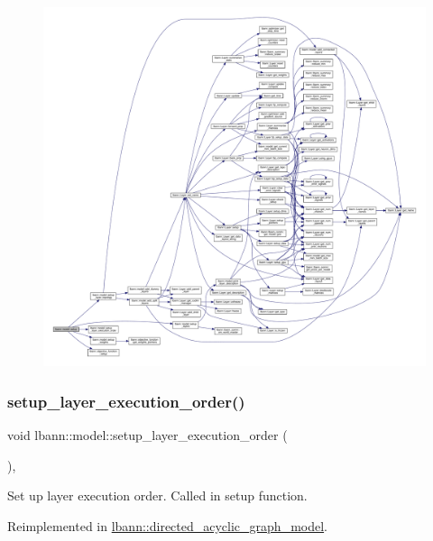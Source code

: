 \begin{figure}[H]
\begin{center}
\leavevmode
\includegraphics[width=350pt]{classlbann_1_1model_afd9dbca79503a40b7aa5c78da4d6f391_cgraph}
\end{center}
\end{figure}
\mbox{\label{classlbann_1_1model_ab0e8af146d4121c1b8b04b4a3c2a455c}} 
\subsubsection{\texorpdfstring{setup\+\_\+layer\+\_\+execution\+\_\+order()}{setup\_layer\_execution\_order()}}
{\footnotesize\ttfamily void lbann\+::model\+::setup\+\_\+layer\+\_\+execution\+\_\+order (\begin{DoxyParamCaption}{ }\end{DoxyParamCaption})\hspace{0.3cm}{\ttfamily [protected]}, {\ttfamily [virtual]}}

Set up layer execution order. Called in setup function. 

Reimplemented in \hyperlink{classlbann_1_1directed__acyclic__graph__model_a2a70d5719832c481db9fa962f6e5f2bd}{lbann\+::directed\+\_\+acyclic\+\_\+graph\+\_\+model}.



